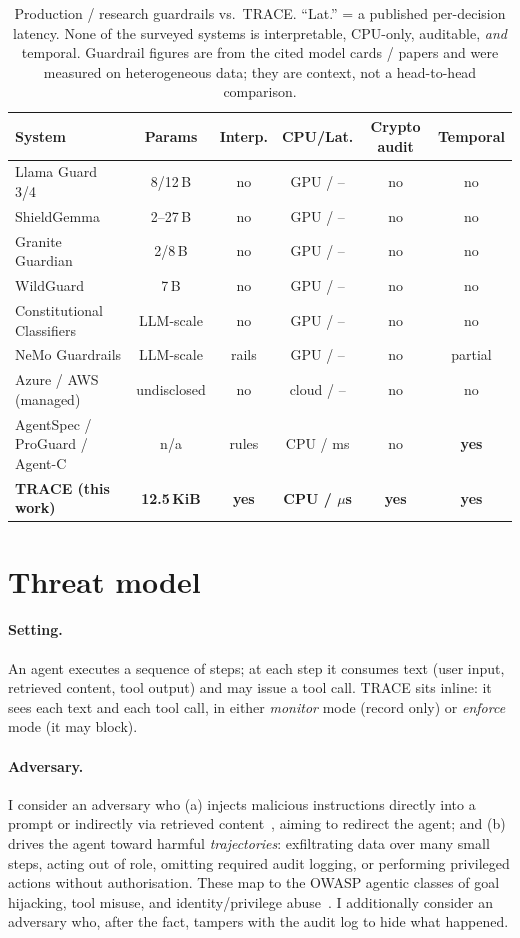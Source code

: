 \documentclass[11pt]{article}
\begin{document}
\begin{table}[t]\centering\small
\caption{Production / research guardrails vs.\ TRACE. ``Lat.'' = a published
per-decision latency. None of the surveyed systems is interpretable, CPU-only,
auditable, \emph{and} temporal. Guardrail figures are from the cited model cards
/ papers and were measured on heterogeneous data; they are context, not a
head-to-head comparison.}
\label{tab:guardrails}
\begin{tabular}{lccccc}
\toprule
System & Params & Interp. & CPU/Lat. & Crypto audit & Temporal \\
\midrule
Llama Guard 3/4 & 8/12\,B & no & GPU / -- & no & no \\
ShieldGemma & 2--27\,B & no & GPU / -- & no & no \\
Granite Guardian & 2/8\,B & no & GPU / -- & no & no \\
WildGuard & 7\,B & no & GPU / -- & no & no \\
Constitutional Classifiers & LLM-scale & no & GPU / -- & no & no \\
NeMo Guardrails & LLM-scale & rails & GPU / -- & no & partial \\
Azure / AWS (managed) & undisclosed & no & cloud / -- & no & no \\
\midrule
AgentSpec / ProGuard / Agent-C & n/a & rules & CPU / ms & no & \textbf{yes} \\
\textbf{TRACE (this work)} & \textbf{12.5\,KiB} & \textbf{yes} & \textbf{CPU / $\mu$s} & \textbf{yes} & \textbf{yes} \\
\bottomrule
\end{tabular}
\end{table}

\section{Threat model}
\label{sec:threat}

\paragraph{Setting.} An agent executes a sequence of steps; at each step it
consumes text (user input, retrieved content, tool output) and may issue a tool
call. TRACE sits inline: it sees each text and each tool call, in either
\emph{monitor} mode (record only) or \emph{enforce} mode (it may block).

\paragraph{Adversary.} I consider an adversary who (a) injects malicious
instructions directly into a prompt or indirectly via retrieved
content~\citep{greshake2023indirect}, aiming to redirect the agent; and (b)
drives the agent toward harmful \emph{trajectories}: exfiltrating data over
many small steps, acting out of role, omitting required audit logging, or
performing privileged actions without authorisation. These map to the OWASP
agentic classes of goal hijacking, tool misuse, and identity/privilege
abuse~\citep{owasp2025agentic}. I additionally consider an adversary who, after
the fact, tampers with the audit log to hide what happened.
\end{document}
